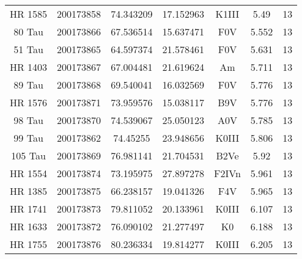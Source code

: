 \begin{table*}
\begin{tabular}{ccccccc}
HR 1585 & 200173858 & 74.343209 & 17.152963 & K1III & 5.49 & 13 \\
80 Tau & 200173866 & 67.536514 & 15.637471 & F0V & 5.552 & 13 \\
51 Tau & 200173865 & 64.597374 & 21.578461 & F0V & 5.631 & 13 \\
HR 1403 & 200173867 & 67.004481 & 21.619624 & Am & 5.711 & 13 \\
89 Tau & 200173868 & 69.540041 & 16.032569 & F0V & 5.776 & 13 \\
HR 1576 & 200173871 & 73.959576 & 15.038117 & B9V & 5.776 & 13 \\
98 Tau & 200173870 & 74.539067 & 25.050123 & A0V & 5.785 & 13 \\
99 Tau & 200173862 & 74.45255 & 23.948656 & K0III & 5.806 & 13 \\
105 Tau & 200173869 & 76.981141 & 21.704531 & B2Ve & 5.92 & 13 \\
HR 1554 & 200173874 & 73.195975 & 27.897278 & F2IVn & 5.961 & 13 \\
HR 1385 & 200173875 & 66.238157 & 19.041326 & F4V & 5.965 & 13 \\
HR 1741 & 200173873 & 79.811052 & 20.133961 & K0III & 6.107 & 13 \\
HR 1633 & 200173872 & 76.090102 & 21.277497 & K0 & 6.188 & 13 \\
HR 1755 & 200173876 & 80.236334 & 19.814277 & K0III & 6.205 & 13 \\
\hline
\end{tabular}
\end{table*}
